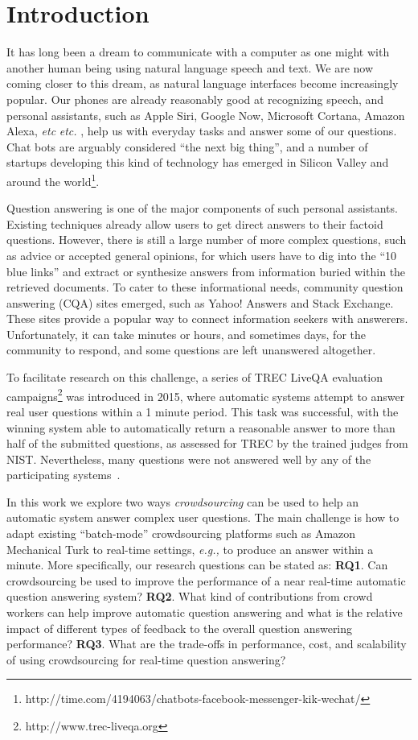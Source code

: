 \documentclass[letterpaper]{article}
\makeatletter
\newcommand{\eg}{\textit{e.g.,}\@\xspace}
\newcommand{\etc}{%
    \@ifnextchar{.}%
        {\textit{etc}}%
        {\textit{etc.}\@\xspace}%
}
\makeatother
\begin{document}
\section{Introduction}
\label{sec:introduction}

It has long been a dream to communicate with a computer as one might with another human being using natural language speech and text.
We are now coming closer to this dream, as natural language interfaces become increasingly popular.
Our phones are already reasonably good at recognizing speech, and personal assistants, such as Apple Siri, Google Now, Microsoft Cortana, Amazon Alexa, \etc, help us with everyday tasks and answer some of our questions.
Chat bots are arguably considered ``the next big thing'', and a number of startups developing this kind of technology has emerged in Silicon Valley and around the world\footnote{http://time.com/4194063/chatbots-facebook-messenger-kik-wechat/}.

Question answering is one of the major components of such personal assistants.
Existing techniques already allow users to get direct answers to their factoid questions.
However, there is still a large number of more complex questions, such as advice or accepted general opinions, for which users have to dig into the ``10 blue links'' and extract or synthesize answers from information buried within the retrieved documents.
To cater to these informational needs, community question answering (CQA) sites emerged, such as Yahoo! Answers and Stack Exchange.
These sites provide a popular way to connect information seekers with answerers.
Unfortunately, it can take minutes or hours, and sometimes days, for the community to respond, and some questions are left unanswered altogether. 

To facilitate research on this challenge, a series of TREC LiveQA evaluation campaigns\footnote{http://www.trec-liveqa.org} was introduced in 2015, where automatic systems attempt to answer real user questions within a 1 minute period.
This task was successful, with the winning system able to automatically return a reasonable answer to more than half of the submitted questions, as assessed for TREC by the trained judges from NIST.
Nevertheless, many questions were not answered well by any of the participating systems~\cite{overviewliveqa15}.

In this work we explore two ways \textit{crowdsourcing} can be used to help an automatic system answer complex user questions.
The main challenge is how to adapt existing ``batch-mode'' crowdsourcing platforms such as Amazon Mechanical Turk to real-time settings, \eg to produce an answer within a minute.
More specifically, our research questions can be stated as:
\textbf{RQ1}. Can crowdsourcing be used to improve the performance of a near real-time automatic question answering system?
\textbf{RQ2}. What kind of contributions from crowd workers can help improve automatic question answering and what is the relative impact of different types of feedback to the overall question answering performance?
\textbf{RQ3}. What are the trade-offs in performance, cost, and scalability of using crowdsourcing for real-time question answering?
\end{document}
